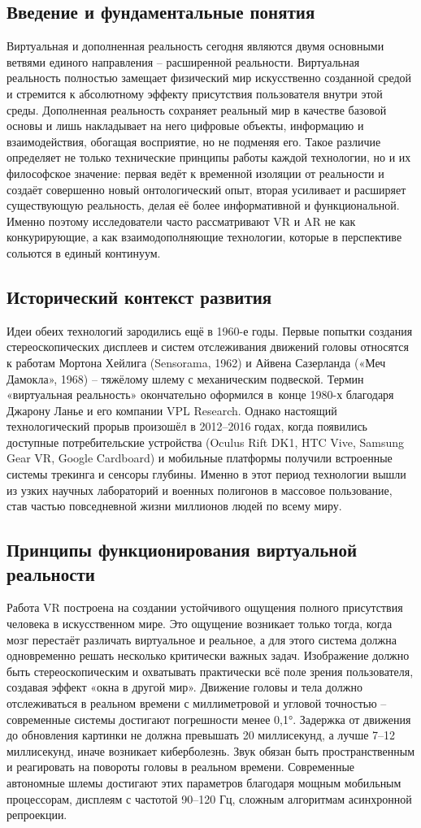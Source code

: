 \documentclass{ou}
\begin{document}
\subsection{Введение и фундаментальные понятия}
Виртуальная и дополненная реальность сегодня являются двумя основными ветвями единого направления -- расширенной реальности. Виртуальная реальность полностью замещает физический мир искусственно созданной средой и стремится к абсолютному эффекту присутствия пользователя внутри этой среды. Дополненная реальность сохраняет реальный мир в качестве базовой основы и лишь накладывает на него цифровые объекты, информацию и взаимодействия, обогащая восприятие, но не подменяя его. Такое различие определяет не только технические принципы работы каждой технологии, но и их философское значение: первая ведёт к временной изоляции от реальности и создаёт совершенно новый онтологический опыт, вторая усиливает и расширяет существующую реальность, делая её более информативной и функциональной. Именно поэтому исследователи часто рассматривают VR и AR не как конкурирующие, а как взаимодополняющие технологии, которые в перспективе сольются в единый континуум.
\subsection{Исторический контекст развития}
Идеи обеих технологий зародились ещё в 1960-е годы. Первые попытки создания стереоскопических дисплеев и систем отслеживания движений головы относятся к работам Мортона Хейлига (Sensorama, 1962) и Айвена Сазерланда («Меч Дамокла», 1968) -- тяжёлому шлему с механическим подвеской. Термин «виртуальная реальность» окончательно оформился в~конце 1980-х благодаря Джарону Ланье и его компании VPL Research. Однако настоящий технологический прорыв произошёл в 2012–2016 годах, когда появились доступные потребительские устройства (Oculus Rift DK1, HTC Vive, Samsung Gear VR, Google Cardboard) и мобильные платформы получили встроенные системы трекинга и сенсоры глубины. Именно в этот период технологии вышли из узких научных лабораторий и военных полигонов в массовое пользование, став частью повседневной жизни миллионов людей по всему миру.
\subsection{Принципы функционирования виртуальной реальности}
Работа VR построена на создании устойчивого ощущения полного присутствия человека в искусственном мире. Это ощущение возникает только тогда, когда мозг перестаёт различать виртуальное и реальное, а для этого система должна одновременно решать несколько критически важных задач. Изображение должно быть стереоскопическим и охватывать практически всё поле зрения пользователя, создавая эффект «окна в другой мир». Движение головы и тела должно отслеживаться в реальном времени с миллиметровой и угловой точностью -- современные системы достигают погрешности менее 0,1°. Задержка от движения до обновления картинки не должна превышать 20 миллисекунд, а лучше 7–12 миллисекунд, иначе возникает киберболезнь. Звук обязан быть пространственным и реагировать на повороты головы в реальном времени. Современные автономные шлемы достигают этих параметров благодаря мощным мобильным процессорам, дисплеям с частотой 90–120 Гц, сложным алгоритмам асинхронной репроекции.
\end{document}
